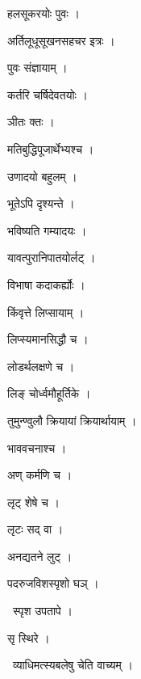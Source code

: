 \documentclass[10pt, openany, oneside]{book}
\begin{document}
\noindent हलसूकरयोः पुवः ।

\noindent अर्तिलूधूसूखनसहचर इत्रः ।

\noindent पुवः संज्ञायाम् ।

\noindent कर्तरि चर्षिदेवतयोः ।

\noindent ञीतः क्तः ।

\noindent मतिबुद्धिपूजार्थेभ्यश्च ।

\noindent उणादयो बहुलम् ।

\noindent भूतेऽपि दृश्यन्ते ।

\noindent भविष्यति गम्यादयः ।

\noindent यावत्पुरानिपातयोर्लट् ।

\noindent विभाषा कदाकर्ह्योः ।

\noindent किंवृत्ते लिप्सायाम् ।

\noindent लिप्स्यमानसिद्धौ च ।

\noindent लोडर्थलक्षणे च ।

\noindent लिङ् चोर्ध्वमौहूर्तिके ।

\noindent तुमुन्ण्वुलौ क्रियायां क्रियार्थायाम् ।

\noindent भाववचनाश्च ।

\noindent अण् कर्मणि च ।

\noindent लृट् शेषे च ।

\noindent लृटः सद् वा ।

\noindent अनद्यतने लुट् ।

\noindent पदरुजविशस्पृशो घञ् ।

\par\noindent\hspace{1.5em}{\vps वा॰}~{\qt स्पृश उपतापे ।}

\noindent सृ स्थिरे ।

\par\noindent\hspace{1.5em}{\vps वा॰}~{\qt व्याधिमत्स्यबलेषु चेति वाच्यम् ।}
\end{document}
